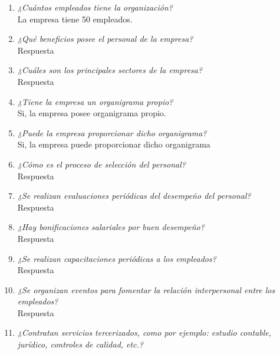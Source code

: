\documentclass[a4paper,10pt]{article}
\begin{document}
		
			\begin{enumerate}[resume]

			\item \textit{¿Cuántos empleados tiene la organización?}\\
			La empresa tiene 50 empleados.
				
			\item \textit{¿Qué beneficios posee el personal de la empresa?}\\
			
			Respuesta
			
			\item \textit{¿Cuáles son los principales sectores de la empresa?}\\
			
			Respuesta
			
			\item \textit{¿Tiene la empresa un organigrama propio?}\\
			Si, la empresa posee organigrama propio.
					
			\item \textit{¿Puede la empresa proporcionar dicho organigrama?}\\
			Si, la empresa puede proporcionar dicho organigrama
			
			\item \textit{¿Cómo es el proceso de selección del personal? }\\
			
			Respuesta
			
			\item \textit{¿Se realizan evaluaciones periódicas del desempeño del personal?}\\
			
			Respuesta
			
			\item \textit{¿Hay bonificaciones salariales por buen desempeño?}\\
			
			Respuesta
			
			\item \textit{¿Se realizan capacitaciones periódicas a los empleados?}\\
			
			Respuesta
			
			\item \textit{¿Se organizan eventos para fomentar la relación interpersonal entre los empleados?}\\
			
			Respuesta
			
			\item \textit{¿Contratan servicios tercerizados, como por ejemplo: estudio contable, jurídico, controles de calidad, etc.?}\\

			\end{enumerate}
			
\end{document}
